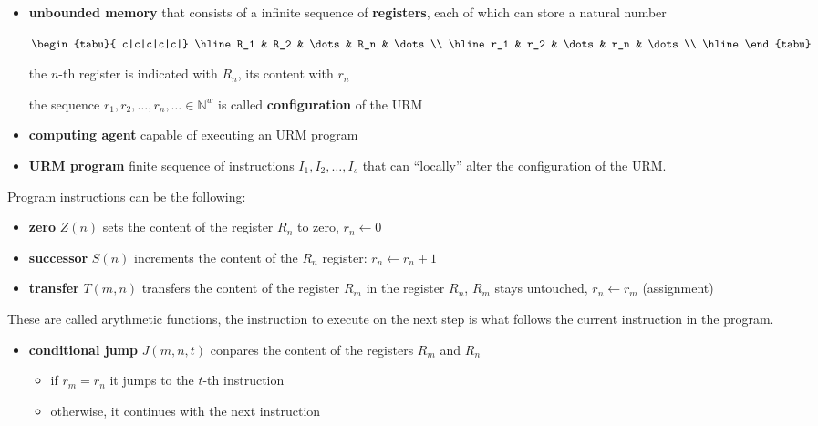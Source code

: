 \documentclass{amsbook}
\newcommand{\nat}{\ensuremath{\mathbb{N}}}
\theoremstyle{definition}
\theoremstyle{remark}
\numberwithin{section}{chapter}
\numberwithin{equation}{chapter}
\begin{document}
\begin{itemize}
\item \textbf{unbounded memory} that consists of a infinite sequence of \textbf{registers}, each of which can store a  natural number


  $\begin{tabu}{|c|c|c|c|c|}
    \hline
    R_1 & R_2 & \dots & R_n & \dots \\
    \hline
    r_1 & r_2 & \dots & r_n & \dots \\
    \hline
  \end{tabu}$

  the $n$-th register is indicated with $R_n$, its content with $r_n$
  
  the sequence $r_1, r_2,\dots, r_n, \dots \in \nat^w$ is called
  \textbf{configuration} of the URM
              
\item \textbf{computing agent} capable of executing an URM program

\item \textbf{URM program} finite sequence of instructions
  $I_1, I_2, \dots, I_s$ that can ``locally'' alter the configuration
  of the URM.
\end{itemize}


Program instructions can be the following:

\begin{itemize}

\item \textbf{zero} $Z(n)$ sets the content of the register $R_n$ to zero, $r_n \leftarrow 0$

\item \textbf{successor} $S(n)$ increments the content of the $R_n$ register: $r_n \leftarrow r_n+1$


\item \textbf{transfer} $T(m,n)$ transfers the content of the register $R_m$ in the register $R_n$, $R_m$ stays untouched, $r_n\leftarrow r_m$ (assignment)
\end{itemize}
These are called arythmetic functions, the instruction to execute on the next step is what follows the current instruction in the program.

\begin{itemize}
\item \textbf{conditional jump} $J(m,n,t)$ conpares the content of the registers $R_m$ and $R_n$
  \begin{itemize}
  \item if $r_m = r_n$ it jumps to the $t$-th instruction
  \item otherwise, it continues with the next instruction
  \end{itemize}
\end{itemize}
\end{document}
